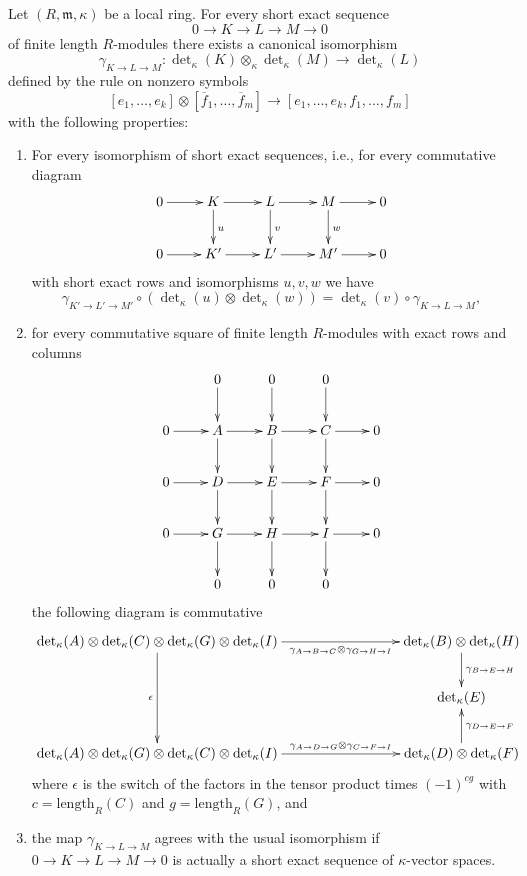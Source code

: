 \begin{lemma}
\label{lemma-det-exact-sequences}
Let $(R, \mathfrak m, \kappa)$ be a local ring.
For every short exact sequence
$$
0 \to K \to L \to M \to 0
$$
of finite length $R$-modules there exists a canonical isomorphism
$$
\gamma_{K \to L \to M} :
\det\nolimits_\kappa(K) \otimes_\kappa \det\nolimits_\kappa(M)
\longrightarrow
\det\nolimits_\kappa(L)
$$
defined by the rule on nonzero symbols
$$
[e_1, \ldots, e_k]
\otimes
[\overline{f}_1, \ldots, \overline{f}_m]
\longrightarrow
[e_1, \ldots, e_k, f_1, \ldots, f_m]
$$
with the following properties:
\begin{enumerate}
\item For every isomorphism of short exact sequences, i.e., for
every commutative diagram
$$
\xymatrix{
0 \ar[r] &
K \ar[r] \ar[d]^u &
L \ar[r] \ar[d]^v &
M \ar[r] \ar[d]^w &
0 \\
0 \ar[r] &
K' \ar[r] &
L' \ar[r] &
M' \ar[r] &
0
}
$$
with short exact rows and isomorphisms $u, v, w$ we have
$$
\gamma_{K' \to L' \to M'} \circ
(\det\nolimits_\kappa(u) \otimes \det\nolimits_\kappa(w))
=
\det\nolimits_\kappa(v) \circ
\gamma_{K \to L \to M},
$$
\item for every commutative square of finite length $R$-modules
with exact rows and columns
$$
\xymatrix{
& 0 \ar[d] & 0 \ar[d] & 0 \ar[d] & \\
0 \ar[r] & A \ar[r] \ar[d] & B \ar[r] \ar[d] & C \ar[r] \ar[d] & 0 \\
0 \ar[r] & D \ar[r] \ar[d] & E \ar[r] \ar[d] & F \ar[r] \ar[d] & 0 \\
0 \ar[r] & G \ar[r] \ar[d] & H \ar[r] \ar[d] & I \ar[r] \ar[d] & 0 \\
& 0  & 0  & 0  &
}
$$
the following diagram is commutative
$$
\xymatrix{
\det\nolimits_\kappa(A) \otimes
\det\nolimits_\kappa(C) \otimes
\det\nolimits_\kappa(G) \otimes 
\det\nolimits_\kappa(I)
\ar[dd]_{\epsilon}
\ar[rrr]_-{\gamma_{A \to B \to C} \otimes \gamma_{G \to H \to I}}
& & &
\det\nolimits_\kappa(B) \otimes 
\det\nolimits_\kappa(H)
\ar[d]^{\gamma_{B \to E \to H}}
\\
& & & \det\nolimits_\kappa(E)
\\
\det\nolimits_\kappa(A) \otimes
\det\nolimits_\kappa(G) \otimes
\det\nolimits_\kappa(C) \otimes 
\det\nolimits_\kappa(I)
\ar[rrr]^-{\gamma_{A \to D \to G} \otimes \gamma_{C \to F \to I}}
& & &
\det\nolimits_\kappa(D) \otimes 
\det\nolimits_\kappa(F)
\ar[u]_{\gamma_{D \to E \to F}}
}
$$
where $\epsilon$ is the switch of the factors in the tensor product
times $(-1)^{cg}$ with $c = \text{length}_R(C)$ and $g = \text{length}_R(G)$,
and
\item the map $\gamma_{K \to L \to M}$ agrees with the usual isomorphism
if $0 \to K \to L \to M \to 0$ is actually a short exact sequence
of $\kappa$-vector spaces.
\end{enumerate}
\end{lemma}

